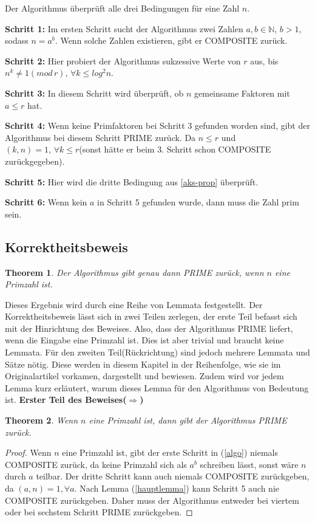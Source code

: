 \documentclass[12pt,oneside]{article}
\newtheorem{theorem}{Theorem}[section]
\theoremstyle{remark}
\theoremstyle{definition}
\begin{document}
Der Algorithmus überprüft alle drei Bedingungen für eine Zahl $n$.\newline

\textbf{Schritt 1: }Im ersten Schritt sucht der Algorithmus zwei Zahlen $a,b \in \mathbb{N}, \, b > 1$, sodass $n = a^b$. Wenn solche Zahlen existieren, gibt er COMPOSITE zurück.  

\textbf{Schritt 2: }Hier probiert der Algorithmus sukzessive Werte von $r$ aus, bis $n^k \neq 1 (mod \, r), \, \forall k \leq log^2 n$.

\textbf{Schritt 3: } In diesem Schritt wird überprüft, ob $n$ gemeinsame Faktoren mit $a \leq r$ hat. 

\textbf{Schritt 4: } Wenn keine Primfaktoren bei Schritt 3 gefunden worden sind, gibt der Algorithmus bei diesem Schritt PRIME zurück. Da $n \leq r$ und $(k,n) = 1, \, \forall k \leq r $(sonst hätte er beim 3. Schritt schon COMPOSITE zurückgegeben).

\textbf{Schritt 5: } Hier wird die dritte Bedingung aus \ref{aks-prop} überprüft.

\textbf{Schritt 6: } Wenn kein $a$ in Schritt 5 gefunden wurde, dann muss die Zahl prim sein. 
\subsection{Korrektheitsbeweis}

\begin{theorem}
Der Algorithmus gibt genau dann PRIME zurück, wenn $n$ eine Primzahl ist.
\end{theorem}
Dieses Ergebnis wird durch eine Reihe von Lemmata festgestellt. Der Korrektheitsbeweis lässt sich in zwei Teilen zerlegen, der erste Teil befasst sich mit der Hinrichtung des Beweises. Also, dass der Algorithmus PRIME liefert, wenn die Eingabe eine Primzahl ist. Dies ist aber trivial und braucht keine Lemmata. Für den zweiten Teil(Rückrichtung) sind jedoch mehrere Lemmata und Sätze nötig. Diese werden in diesem Kapitel in der Reihenfolge, wie sie im Originalartikel vorkamen, dargestellt und bewiesen. Zudem wird vor jedem Lemma kurz erläutert, warum dieses Lemma für den Algorithmus von Bedeutung ist.
\textbf{Erster Teil des Beweises($\Rightarrow$)}
\begin{theorem}
Wenn $n$ eine Primzahl ist, dann gibt der Algorithmus PRIME zurück.
\end{theorem}

\begin{proof}
Wenn $n$ eine Primzahl ist, gibt der erste Schritt in (\ref{algo}) niemals COMPOSITE zurück, da keine Primzahl sich als $a^b$ schreiben lässt, sonst wäre $n$ durch $a$ teilbar. Der dritte Schritt kann auch niemals COMPOSITE zurückgeben, da $(a,n) = 1, \forall a$. Nach Lemma (\ref{hauptlemma}) kann Schritt 5 auch nie COMPOSITE zurückgeben. Daher muss der Algorithmus entweder bei viertem oder bei sechstem Schritt PRIME zurückgeben.  
\end{proof}
\end{document}
